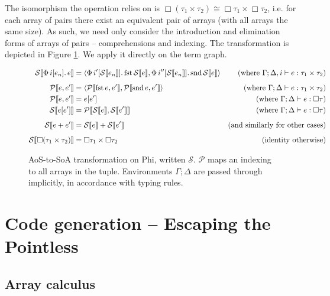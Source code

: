 The isomorphism the operation relies on is $\Box (\tau_1 \times \tau_2) \cong \Box \tau_1 \times \Box \tau_2$, i.e. for each array of pairs there exist an equivalent pair of arrays (with all arrays the same size). As such, we need only consider the introduction and elimination forms of arrays of pairs -- comprehensions and indexing. The transformation is depicted in Figure \ref{fig:aos-to-soa}. We apply it directly on the term graph. 

\newcommand{\phisoa}[1]{\mathcal S \left\llbracket {#1} \right\rrbracket}
\newcommand{\phitupleindex}[2]{\mathcal P \left\llbracket {#1}, {#2} \right\rrbracket}

\begin{figure}[h]
    \centering
    \begin{align*}
\phisoa {\phivec{i}{e_n}{e}}
&= \phipair{\phivec{i'}{\phisoa{e_n}}{\phifst{\phisoa{e}}}}{\phivec{i''}{\phisoa{e_n}}{\phisnd{\phisoa{e}}}}
&\text{(where }\Gamma; \Delta, i \vdash e : \phipairtype{\tau_1}{\tau_2} \text{)} \\[0.5em]
\phitupleindex{e}{e'}
&= \phipair{\phitupleindex{\phifst{e}}{e'}}{\phitupleindex{\phisnd{e}}{e'}}
&\text{(where }\Gamma; \Delta \vdash e : \phipairtype{\tau_1}{\tau_2} \text{)} \\
\phitupleindex{e}{e'}
&= e\left[ e' \right]
&\text{(where }\Gamma; \Delta \vdash e : \phivectype{\tau} \text{)} \\
\phisoa{e[e']}
&= \phitupleindex{\phisoa{e}}{\phisoa{e'}}
&\text{(where }\Gamma; \Delta \vdash e : \phivectype{\tau} \text{)} \\[0.5em]
\phisoa{e + e'}
&= \phisoa{e} + \phisoa{e'}
&\text{(and similarly for other cases)} \\[0.5em]
\phisoa{\phivectype{(\phipairtype{\tau_1}{\tau_2}})} &= \phipairtype{\phivectype{\tau_1}}{\phivectype{\tau_2}} &\text{(identity otherwise)}
    \end{align*}
    \caption{AoS-to-SoA transformation on Phi, written $\mathcal S$. $\mathcal P$ maps an indexing to all arrays in the tuple. Environments $\Gamma; \Delta$ are passed through implicitly, in accordance with typing rules.}
    \label{fig:aos-to-soa}
\end{figure}

\section{Code generation -- Escaping the Pointless}
\label{escaping-the-pointless}

\subsection{Array calculus}

